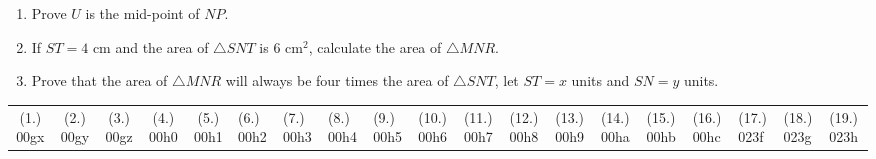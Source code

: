 \begin{eocexercises}{}
\begin{enumerate}[itemsep=20pt, label=\textbf{\arabic*}.]
\begin{center}
{}
\end{center}
\begin{enumerate}[noitemsep, label=\textbf{(\alph*)} ]
\item Prove $U$ is the mid-point of $NP$.
\item If $ST=4$ cm and the area of $\triangle SNT$ is $6$ cm$^2$, calculate the area of $\triangle MNR$.
\item Prove that the area of $\triangle MNR$ will always be four times the area of $\triangle SNT$, let $ST=x$ units and $SN=y$ units.
\end{enumerate}
\end{enumerate}
\practiceinfo
\par \begin{tabular}[h]{ccccc}
(1.) 00gx&  (2.) 00gy&  (3.) 00gz&  (4.) 00h0&  (5.) 00h1&  (6.) 00h2& 
(7.) 00h3&  (8.) 00h4&  (9.) 00h5&  (10.) 00h6&  (11.) 00h7&  (12.) 00h8& (13.) 00h9& (14.) 00ha& (15.) 00hb& (16.) 00hc & (17.) 023f &(18.) 023g &(19.) 023h \end{tabular}
\end{eocexercises}

